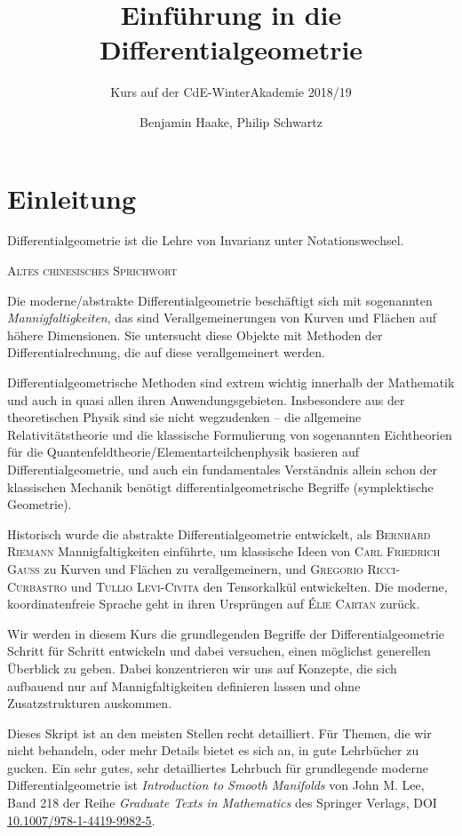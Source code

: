\documentclass[a4paper]{scrreprt}
\title{Einführung in die Differentialgeometrie}
\subtitle{Kurs auf der CdE-WinterAkademie 2018/19}
\author{Benjamin Haake, Philip Schwartz}
\date{}
\numberwithin{equation}{chapter}
\theoremstyle{definition}
\begin{document}
\maketitle

\setcounter{chapter}{-1}
\chapter{Einleitung}
\epigraph{Differentialgeometrie ist die Lehre von Invarianz unter Notationswechsel.}{\textsc{Altes chinesisches Sprichwort}}

Die moderne/abstrakte Differentialgeometrie beschäftigt sich mit sogenannten \emph{Mannigfaltigkeiten}, das sind Verallgemeinerungen von Kurven und Flächen auf höhere Dimensionen. Sie untersucht diese Objekte mit Methoden der Differentialrechnung, die auf diese verallgemeinert werden.

Differentialgeometrische Methoden sind extrem wichtig innerhalb der Mathematik und auch in quasi allen ihren Anwendungsgebieten. Insbesondere aus der theoretischen Physik sind sie nicht wegzudenken -- die allgemeine Relativitätstheorie und die klassische Formulierung von sogenannten Eichtheorien für die Quantenfeldtheorie/Elementarteilchenphysik basieren auf Differentialgeometrie, und auch ein fundamentales Verständnis allein schon der klassischen Mechanik benötigt differentialgeometrische Begriffe (symplektische Geometrie).

Historisch wurde die abstrakte Differentialgeometrie entwickelt, als \textsc{Bernhard Riemann} Mannigfaltigkeiten einführte, um klassische Ideen von \textsc{Carl Friedrich Gauß} zu Kurven und Flächen zu verallgemeinern, und \textsc{Gregorio Ricci-Curbastro} und \textsc{Tullio Levi-Civita} den Tensorkalkül entwickelten. Die moderne, koordinatenfreie Sprache geht in ihren Ursprüngen auf \textsc{Élie Cartan} zurück.

Wir werden in diesem Kurs die grundlegenden Begriffe der Differentialgeometrie Schritt für Schritt entwickeln und dabei versuchen, einen möglichst generellen Überblick zu geben. Dabei konzentrieren wir uns auf Konzepte, die sich aufbauend nur auf Mannigfaltigkeiten definieren lassen und ohne Zusatzstrukturen auskommen.

Dieses Skript ist an den meisten Stellen recht detailliert. Für Themen, die wir nicht behandeln, oder mehr Details bietet es sich an, in gute Lehrbücher zu gucken. Ein sehr gutes, sehr detailliertes Lehrbuch für grundlegende moderne Differentialgeometrie ist \emph{Introduction to	Smooth Manifolds} von John M. Lee, Band 218 der Reihe \emph{Graduate Texts in Mathematics} des Springer Verlags, DOI \href{https://doi.org/10.1007/978-1-4419-9982-5}{10.1007/978-1-4419-9982-5}.
\end{document}
